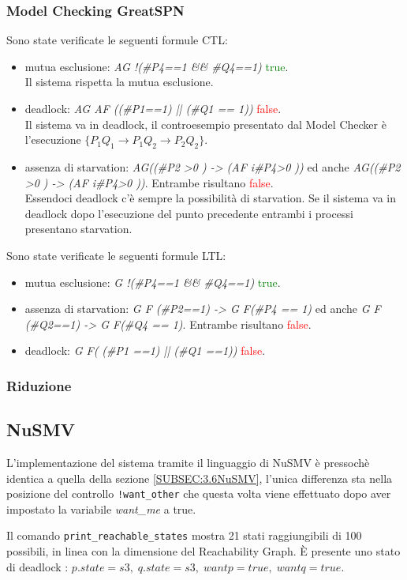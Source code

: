 \documentclass[a4paper]{article}
\begin{document}
\subsubsection{Model Checking GreatSPN}
Sono state verificate le seguenti formule CTL:
\begin{itemize}
	\item mutua esclusione: \textit{AG !(\#P4==1 \&\& \#Q4==1)} \textcolor{green}{true}.\\
		Il sistema rispetta la mutua esclusione.
	\item deadlock: \textit{AG AF ((\#P1==1) || (\#Q1 == 1))} \textcolor{red}{false}.\\
		Il sistema va in deadlock, il controesempio presentato dal Model Checker è l'esecuzione $\{P_1Q_1 \rightarrow P_1Q_2 \rightarrow P_2Q_2\}$.
	\item assenza di starvation: \textit{AG((\#P2 >0 ) -> (AF i\#P4>0 ))} ed anche \textit{AG((\#P2 >0 ) -> (AF i\#P4>0 ))}. Entrambe risultano \textcolor{red}{false}.\\
		Essendoci deadlock c'è sempre la possibilità di starvation. Se il sistema va in deadlock dopo l'esecuzione del punto precedente entrambi i processi presentano starvation.
\end{itemize}
Sono state verificate le seguenti formule LTL:
\begin{itemize}
	\item mutua esclusione: \textit{G !(\#P4==1 \&\& \#Q4==1)} \textcolor{green}{true}.
	\item assenza di starvation: \textit{G F (\#P2==1) -> G F(\#P4 == 1)} ed anche \textit{G F (\#Q2==1) -> G F(\#Q4 == 1)}. Entrambe risultano \textcolor{red}{false}.\\
	\item deadlock: \textit{G F( (\#P1 ==1) ||  (\#Q1 ==1))} \textcolor{red}{false}.
\end{itemize}

\subsubsection{Riduzione}

\subsection{NuSMV}
L'implementazione del sistema tramite il linguaggio di NuSMV è pressochè identica a quella della sezione \ref{SUBSEC:3.6NuSMV}, l'unica differenza sta nella posizione del controllo \texttt{!want\_other} che questa volta viene effettuato dopo aver impostato la variabile \textit{want\_me} a true.

Il comando \texttt{print\_reachable\_states} mostra 21 stati raggiungibili di 100 possibili, in linea con la dimensione del Reachability Graph.
È presente uno stato di deadlock : $p.state=s3, \; q.state=s3, \; wantp = true, \; wantq = true $. 
\end{document}
